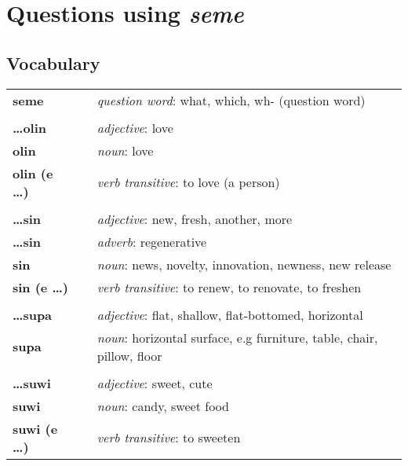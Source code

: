 \section{Questions using \textit{seme}}
\subsection*{Vocabulary}
%
\begin{supertabular}{p{2,5cm}|ll}
\textbf{seme} && \textit{question word}: what, which, wh- (question word) \\ %
 && \\ %
\textbf{\dots olin} && \textit{adjective}: love \\ %
\textbf{olin} && \textit{noun}: love \\ %
\textbf{olin (e \dots)} && \textit{verb transitive}: to love (a person) \\ %
 && \\ %
\textbf{\dots sin} && \textit{adjective}: new, fresh, another, more \\ %
\textbf{ \dots sin } && \textit{adverb}: regenerative \\ %
\textbf{sin} && \textit{noun}: news, novelty, innovation, newness, new release \\ %
\textbf{sin (e \dots)} && \textit{verb transitive}: to renew, to renovate, to freshen \\ %
 && \\ %
\textbf{\dots supa} && \textit{adjective}: flat, shallow, flat-bottomed, horizontal \\ %
\textbf{supa} && \textit{noun}: horizontal surface, e.g furniture, table, chair, pillow, floor \\ %
 && \\ %
\textbf{\dots suwi} && \textit{adjective}: sweet, cute \\ %
\textbf{suwi} && \textit{noun}: candy, sweet food \\ %
\textbf{suwi (e \dots)} && \textit{verb transitive}: to sweeten \\ %
\end{supertabular} \\
%
{}
